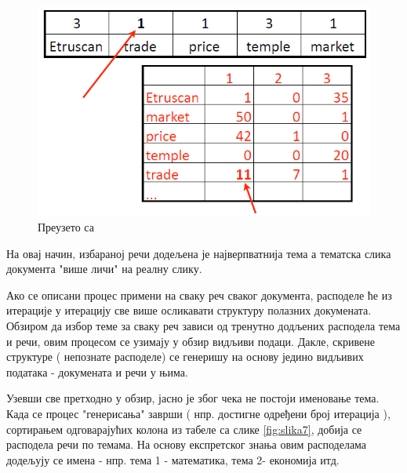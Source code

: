 \begin{figure}[H]
    \centering
   \includegraphics[scale=0.6]{./Slike/slika11.png} 
	\caption{Преузето са \cite{mimno1}}
	\label{fig:slika11}
\end{figure}


На овај начин, избараној речи додељена је најверпватнија тема а тематска слика документа "више личи" на реалну слику. 

Ако се описани процес примени на сваку реч сваког документа, расподеле ће из итерације у итерацију све више осликавати структуру полазних докумената. Обзиром да избор теме за сваку реч зависи од тренутно додљених расподела тема и речи, овим процесом се узимају у обзир видљиви подаци. Дакле, скривене структуре ( непознате расподеле) се генеришу на основу једино видљивих података - докумената и речи у њима.

Узевши све претходно у обзир, јасно је због чека не постоји именовање тема. Када се процес "генерисања"   заврши ( нпр. достигне  одређени број итерација ), сортирањем одговарајућих колона из табеле са слике \ref{fig:slika7}, добија се  расподела речи по темама. На основу експретског знања овим расподелама додељују се имена - нпр. тема 1 - математика, тема 2- економија итд.

%




























